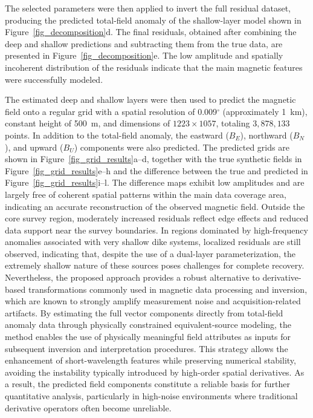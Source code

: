 The selected parameters were then applied to invert the full residual
dataset, producing the predicted total-field anomaly of the shallow-layer model shown in
Figure~\ref{fig_decomposition}d. The final residuals, obtained after combining
the deep and shallow predictions and subtracting them from the true data, are presented in
Figure~\ref{fig_decomposition}e. The low amplitude and spatially incoherent
distribution of the residuals indicate that the main magnetic features were
successfully modeled.

The estimated deep and shallow layers were then used to predict the magnetic field
onto a regular grid with a spatial resolution of 0.009$^\circ$ (approximately
1~km), constant height of
500~m, and dimensions of $1223 \times 1057$, totaling $3,878,133$ points. In
addition to the total-field anomaly, the eastward ($B_E$), northward ($B_N$),
and upward ($B_U$) components were also predicted.
The predicted grids are shown in Figure~\ref{fig_grid_results}a--d, together
with the true synthetic fields in Figure~\ref{fig_grid_results}e--h and the
difference between the true and predicted in Figure~\ref{fig_grid_results}i--l.
The difference maps exhibit low amplitudes and are largely free of coherent
spatial patterns within the main data coverage area, indicating an accurate
reconstruction of the observed magnetic field. Outside the core survey
region, moderately increased residuals reflect edge effects and reduced data
support near the survey boundaries. In regions dominated by high-frequency
anomalies associated with very shallow dike systems, localized residuals are
still observed, indicating that, despite the use of a dual-layer
parameterization, the extremely shallow nature of these sources poses
challenges for complete recovery.
Nevertheless, the proposed approach provides a robust alternative to
derivative-based transformations commonly used in magnetic data processing
and inversion, which are known to strongly amplify measurement noise and
acquisition-related artifacts. By estimating the full vector components
directly from total-field anomaly data through physically constrained
equivalent-source modeling, the method enables the use of physically
meaningful field attributes as inputs for subsequent inversion and
interpretation procedures.
This strategy allows the enhancement of short-wavelength features while
preserving numerical stability, avoiding the instability typically
introduced by high-order spatial derivatives. As a result, the predicted
field components constitute a reliable basis for further quantitative
analysis, particularly in high-noise environments where traditional
derivative operators often become unreliable.

